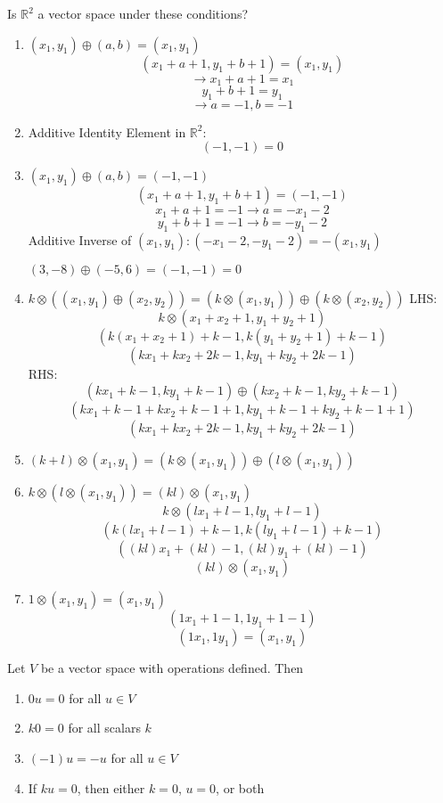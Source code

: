 \documentclass[12pt]{article}
\begin{document}
Is $\mathbb{R}^2$ a vector space under these conditions? \begin{enumerate} 
\item $(x_1, y_1) \oplus (a, b) = (x_1, y_1)$ \newline $$ (x_1 + a + 1, y_1 + b + 1) = (x_1, y_1) $$ $$\rightarrow x_1 + a + 1 = x_1 $$ $$ y_1 + b + 1 = y_1 $$ $$ \rightarrow a = -1, b = -1 $$ 
\item Additive Identity Element in $\mathbb{R}^2$: $$(-1, -1) = 0$$ 
\item $(x_1, y_1) \oplus (a, b) = (-1, -1)$ $$ (x_1 + a + 1, y_1 + b + 1) = (-1, -1) $$ $$ x_1 + a + 1 = -1 \rightarrow a = -x_1 - 2 $$ $$ y_1 + b + 1 = -1 \rightarrow b = -y_1 - 2 $$ Additive Inverse of $(x_1, y_1): (-x_1 - 2, -y_1 - 2) = -(x_1, y_1)$ \begin{example} $ (3, -8) \oplus (-5, 6) = (-1, -1) = 0 $ \end{example}  
\item  $k \otimes ((x_1, y_1) \oplus (x_2, y_2)) = (k\otimes (x_1, y_1)) \oplus (k\otimes (x_2, y_2)) $ LHS: $$ k \otimes (x_1 + x_2 + 1, y_1 + y_2 + 1) $$ $$ (k(x_1 + x_2 + 1) + k - 1, k(y_1 + y_2 + 1) + k - 1) $$ $$ (kx_1 + kx_2 + 2k - 1, ky_1 + ky_2 + 2k - 1) $$ RHS: $$ (kx_1 + k - 1, ky_1 + k - 1) \oplus (kx_2 + k - 1, ky_2 + k - 1) $$ $$ (kx_1 + k - 1 + kx_2 + k - 1 + 1, ky_1 + k - 1 + ky_2 + k - 1 + 1) $$ $$ (kx_1 + kx_2 + 2k - 1, ky_1 + ky_2 + 2k - 1) $$
\item $ (k + l) \otimes (x_1, y_1) = (k\otimes (x_1, y_1)) \oplus (l\otimes (x_1, y_1)) $
\item $ k\otimes (l \otimes (x_1, y_1)) = (kl) \otimes (x_1, y_1) $ $$ k\otimes (lx_1 + l - 1, ly_1 + l - 1) $$ $$ (k(lx_1 + l - 1) + k - 1, k(ly_1 + l - 1) + k - 1) $$ $$ ((kl)x_1 + (kl) - 1, (kl)y_1 + (kl) - 1) $$ $$ (kl) \otimes (x_1, y_1) $$ 
\item $1 \otimes (x_1, y_1) = (x_1, y_1) $ $$ (1x_1 + 1 - 1, 1y_1 + 1 - 1) $$ $$ (1x_1, 1y_1) = (x_1, y_1) $$ 
\end{enumerate} 
\begin{theorem} Let $V$ be a vector space with operations defined. Then \begin{enumerate} 
\item $0u = 0$ for all $ u \in V$ 
\item $k0 = 0$ for all scalars $k$ 
\item $(-1)u = -u$ for all $u \in V$ 
\item If $ku = 0$, then either $k = 0$, $u = 0$, or both \end{enumerate} \end{theorem}
\end{document}
